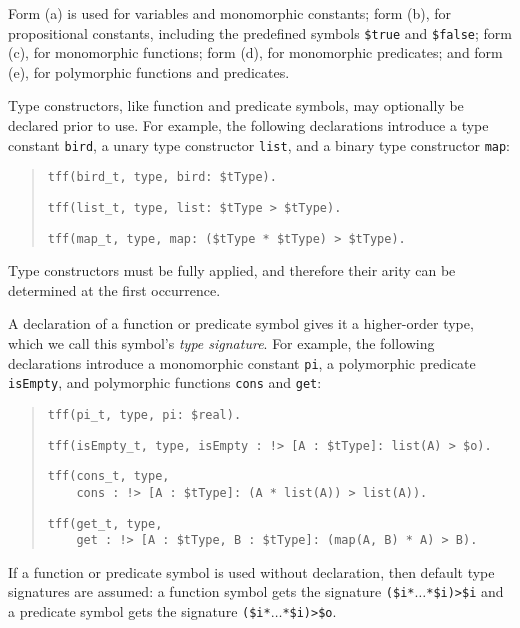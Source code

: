 Form (a) is used for variables and monomorphic constants; form (b), for
propositional constants, including the predefined symbols \verb+$true+ and
\verb+$false+; form (c), for monomorphic functions; form (d), for monomorphic
predicates; and form (e), for polymorphic functions and predicates.



 Type constructors,
like function and predicate symbols,
may optionally be declared prior to use.
For example, the following declarations introduce a type
constant {\tt bird}, a unary type constructor {\tt list},
and a binary type constructor {\tt map}:
\begin{quote}
\verb+tff(bird_t, type, bird: $tType).+
\par\smallskip
\verb+tff(list_t, type, list: $tType > $tType).+
\par\smallskip
\verb+tff(map_t, type, map: ($tType * $tType) > $tType).+
\end{quote}
Type constructors must be fully applied, and therefore
their arity can be %
determined at the first occurrence.

A declaration of a function or predicate symbol gives it
a higher-order type, which we call this symbol's
{\em type signature}. For example, the following
declarations introduce a monomorphic constant {\tt pi},
a polymorphic predicate {\tt isEmpty}, and polymorphic
functions {\tt cons} and {\tt get}:
\begin{quote}
\verb+tff(pi_t, type, pi: $real).+
\par\smallskip
\verb+tff(isEmpty_t, type, isEmpty : !> [A : $tType]: list(A) > $o).+
\par\smallskip
\verb+tff(cons_t, type,+\\
\verb+    cons : !> [A : $tType]: (A * list(A)) > list(A)).+
\par\smallskip
\verb+tff(get_t, type,+\\
\verb+    get : !> [A : $tType, B : $tType]: (map(A, B) * A) > B).+
\end{quote}
If a function or predicate symbol is used without declaration,
then default type signatures are assumed:
a function symbol gets the signature
{\tt (\$i\;*\;${\dots}$\;*\;\$i)\;>\;\$i} and
a predicate symbol gets the signature
{\tt (\$i\;*\;${\dots}$\;*\;\$i)\;>\;\$o}.

